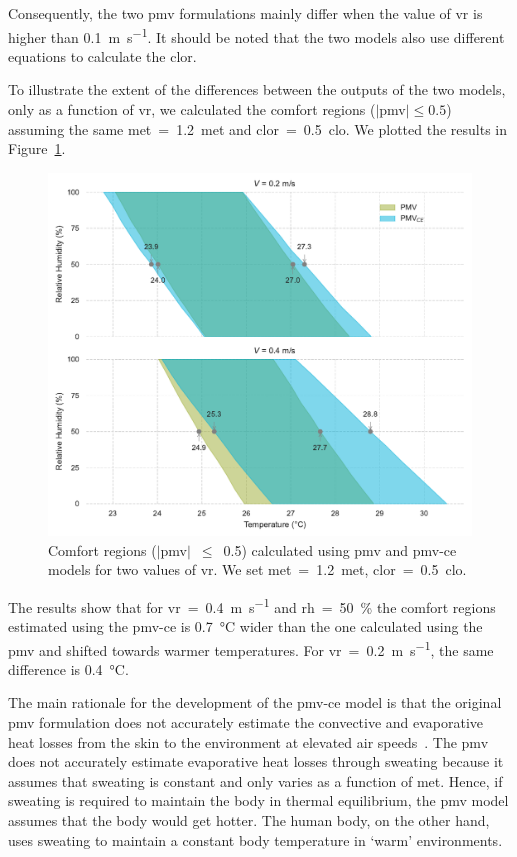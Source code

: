Consequently, the two \ac{pmv} formulations mainly differ when the value of \ac{vr} is higher than \qty{0.1}{\m\per\s}.
It should be noted that the two models also use different equations to calculate the \ac{clor}.

To illustrate the extent of the differences between the outputs of the two models, only as a function of \ac{vr}, we calculated the comfort regions ($\mid$\ac{pmv}$\mid \leq 0.5$) assuming the same \ac{met}~=~\qty{1.2}{met} and \ac{clor}~=~\qty{0.5}{clo}.
We plotted the results in Figure~\ref{fig:comfort_regios_pmv_pmvce}.
\begin{figure}[!htb]
    \centering
    \includegraphics[width=1\textwidth]{figures/pmv_comfort_regions}
    \caption{Comfort regions ($|$\ac{pmv}$|$~$\leq$~\num{0.5}) calculated using \ac{pmv} and \ac{pmv-ce} models for two values of \ac{vr}.
    We set \ac{met}~=~\qty{1.2}{met}, \ac{clor}~=~\qty{0.5}{clo}.
    \label{fig:comfort_regios_pmv_pmvce}}
\end{figure}
The results show that for \ac{vr}~=~\qty{0.4}{\m\per\s} and \ac{rh}~=~\qty{50}{\percent} the comfort regions estimated using the \ac{pmv-ce} is \qty{0.7}{\celsius} wider than the one calculated using the \ac{pmv} and shifted towards warmer temperatures.
For \ac{vr}~=~\qty{0.2}{\m\per\s}, the same difference is \qty{0.4}{\celsius}.

The main rationale for the development of the \ac{pmv-ce} model is that the original \ac{pmv} formulation does not accurately estimate the convective and evaporative heat losses from the skin to the environment at elevated air speeds~\cite{huang_applicability_2014}.
The \ac{pmv} does not accurately estimate evaporative heat losses through sweating because it assumes that sweating is constant and only varies as a function of \ac{met}.
Hence, if sweating is required to maintain the body in thermal equilibrium, the \ac{pmv} model assumes that the body would get hotter.
The human body, on the other hand, uses sweating to maintain a constant body temperature in `warm' environments.

